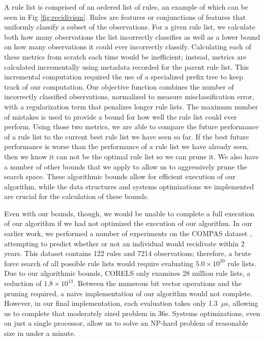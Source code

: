 \documentclass[format=sigconf]{acmart}
\begin{document}
A rule list is comprised of an ordered list of rules, an example of which can be seen in Fig \ref{fig:recidivism}.
Rules are features or conjunctions of features that uniformly classify a subset of the observations.
For a given rule list, we calculate both how many observations the list incorrectly classifies as well as a lower bound on how many observations it could ever incorrectly classify.
Calculating each of these metrics from scratch each time would be inefficient; instead, metrics are calculated incrementally using metadata recorded for the parent rule list.
This incremental computation required the use of a specialized prefix tree to keep track of our computation.
Our objective function combines the number of incorrectly classified observations, normalized to measure misclassification error, with a regularization term that penalizes longer rule lists.
The maximum number of mistakes is used to provide a bound for how well the rule list could ever perform.
Using those two metrics, we are able to compare the future performance of a rule list to the current best rule list we have seen so far.
If the best future performance is worse than the performance of a rule list we have already seen, then we know it can not be the optimal rule list so we can prune it.
We also have a number of other bounds that we apply to allow us to aggressively prune the search space.
These algorithmic bounds allow for efficient execution of our algorithm, while the data structures and systems optimizations we implemented are crucial for the calculation of these bounds.

Even with our bounds, though, we would be unable to complete a full execution of our algorithm if we had not optimized the execution of our algorithm.
In our earlier work, we performed a number of experiments on the COMPAS dataset \cite{LarsonMaKiAn16}, attempting to predict whether or not an individual would recidivate within 2 years.
This dataset contains 122 rules and 7214 observations; therefore, a brute force search of all possible rule lists would require evaluating ${5.0 \times 10^{20}}$ rule lists.
Due to our algorithmic bounds, CORELS only examines 28 million rule lists, a reduction of ${1.8 \times 10^{13}}$.
Between the numerous bit vector operations and the pruning required, a naive implementation of our algorithm would not complete.
However, in our final implementation, each evaluation takes only 1.3~$\mu$s, allowing us to complete that moderately sized problem in 36s.
Systems optimizations, even on just a single processor, allow us to solve an NP-hard problem of reasonable size in under a minute.
\end{document}
